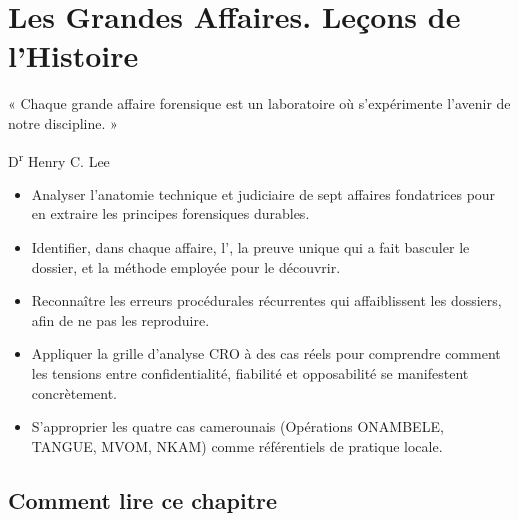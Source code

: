 
\chapter{Les Grandes Affaires. Leçons de l'Histoire}
\label{chap:gr-affaires}

\epigraph{%
    « Chaque grande affaire forensique est un laboratoire où s'expérimente
    l'avenir de notre discipline. »%
}{D\textsuperscript{r} Henry C. Lee}


\begin{boxobjectifs}
\begin{itemize}
    \item Analyser l'anatomie technique et judiciaire de sept affaires
          fondatrices pour en extraire les principes forensiques durables.
    \item Identifier, dans chaque affaire, l',
          la preuve unique qui a fait basculer le dossier, et la méthode
          employée pour le découvrir.
    \item Reconnaître les erreurs procédurales récurrentes qui affaiblissent
          les dossiers, afin de ne pas les reproduire.
    \item Appliquer la grille d'analyse CRO à des cas réels pour comprendre
          comment les tensions entre confidentialité, fiabilité et opposabilité
          se manifestent concrètement.
    \item S'approprier les quatre cas camerounais (Opérations ONAMBELE, TANGUE,
          MVOM, NKAM) comme référentiels de pratique locale.
\end{itemize}
\end{boxobjectifs}

\bigskip

\section*{Comment lire ce chapitre}

